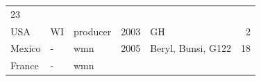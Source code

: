 \documentclass[fleqn,10pt,lineno]{wlpeerj} %
\theoremstyle{definition}
\theoremstyle{definition}
\theoremstyle{definition}
\theoremstyle{remark}
\begin{document}
\begin{longtable}[]{@{}lllrlr@{}}
\begin{minipage}[t]{0.04\columnwidth}
23\strut
\end{minipage}\tabularnewline
\begin{minipage}[t]{0.11\columnwidth}\raggedright\strut
USA\strut
\end{minipage} & \begin{minipage}[t]{0.08\columnwidth}\raggedright\strut
WI\strut
\end{minipage} & \begin{minipage}[t]{0.12\columnwidth}\raggedright\strut
producer\strut
\end{minipage} & \begin{minipage}[t]{0.19\columnwidth}\raggedleft\strut
2003\strut
\end{minipage} & \begin{minipage}[t]{0.29\columnwidth}\raggedright\strut
GH\strut
\end{minipage} & \begin{minipage}[t]{0.04\columnwidth}\raggedleft\strut
2\strut
\end{minipage}\tabularnewline
\begin{minipage}[t]{0.11\columnwidth}\raggedright\strut
Mexico\strut
\end{minipage} & \begin{minipage}[t]{0.08\columnwidth}\raggedright\strut
-\strut
\end{minipage} & \begin{minipage}[t]{0.12\columnwidth}\raggedright\strut
wmn\strut
\end{minipage} & \begin{minipage}[t]{0.19\columnwidth}\raggedleft\strut
2005\strut
\end{minipage} & \begin{minipage}[t]{0.29\columnwidth}\raggedright\strut
Beryl, Bunsi, G122\strut
\end{minipage} & \begin{minipage}[t]{0.04\columnwidth}\raggedleft\strut
18\strut
\end{minipage}\tabularnewline
\begin{minipage}[t]{0.11\columnwidth}\raggedright\strut
France\strut
\end{minipage} & \begin{minipage}[t]{0.08\columnwidth}\raggedright\strut
-\strut
\end{minipage} & \begin{minipage}[t]{0.12\columnwidth}\raggedright\strut
wmn\strut
\end{minipage} & \begin{minipage}[t]{0.19\columnwidth}\raggedleft\strut

\end{minipage}
\end{longtable}
\end{document}
